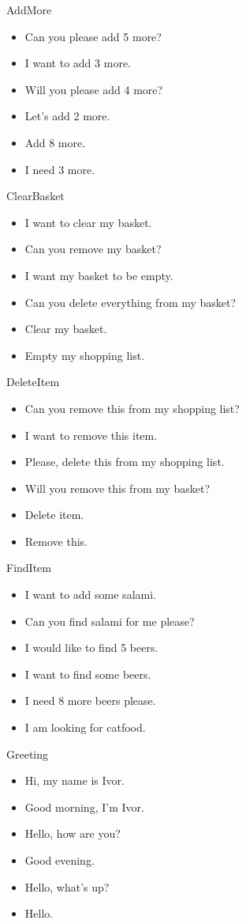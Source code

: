 AddMore
\begin{itemize}
	\item Can you please add 5 more?
	\item I want to add 3 more.
	\item Will you please add 4 more?
	\item Let's add 2 more.
	\item Add 8 more.
	\item I need 3 more.
\end{itemize}

ClearBasket
\begin{itemize}
	\item I want to clear my basket.
	\item Can you remove my basket?
	\item I want my basket to be empty.
	\item Can you delete everything from my basket?
	\item Clear my basket.
	\item Empty my shopping list.
\end{itemize}

DeleteItem
\begin{itemize}
	\item Can you remove this from my shopping list?
	\item I want to remove this item.
	\item Please, delete this from my shopping list.
	\item Will you remove this from my basket?
	\item Delete item.
	\item Remove this.
\end{itemize}

FindItem
\begin{itemize}
	\item I want to add some salami.
	\item Can you find salami for me please?
	\item I would like to find 5 beers.
	\item I want to find some beers.
	\item I need 8 more beers please.
	\item I am looking for catfood.
\end{itemize}

Greeting
\begin{itemize}
	\item Hi, my name is Ivor.
	\item Good morning, I'm Ivor.
	\item Hello, how are you?
	\item Good evening.
	\item Hello, what's up?
	\item Hello.
\end{itemize}

